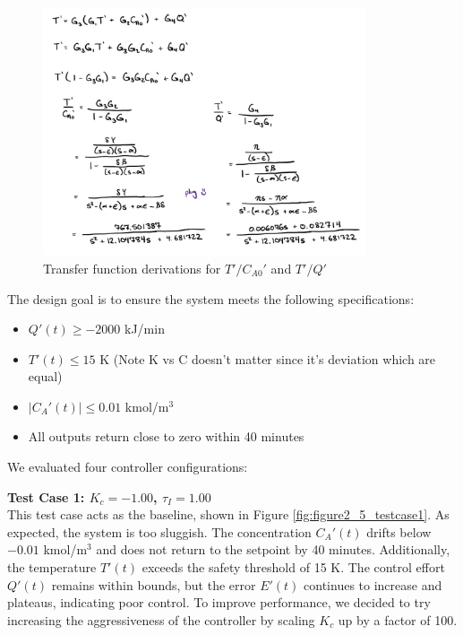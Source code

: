 \documentclass[12pt]{article}
\begin{document}
\begin{enumerate}
\begin{enumerate}
    \begin{figure}[H]
      \centering
      \includegraphics[width=0.85\textwidth]{Figures/figure2_5b.png}
      \caption{Transfer function derivations for $T'/C_{A0}'$ and $T'/Q'$}
      \label{fig:figure2_5b}
    \end{figure}
    
    The design goal is to ensure the system meets the following specifications:
    \begin{itemize}
      \item $Q'(t) \geq -2000$ kJ/min
      \item $T'(t) \leq 15$ K (Note K vs C doesn't matter since it's deviation which are equal)
      \item $|C_A'(t)| \leq 0.01$ kmol/m$^3$
      \item All outputs return close to zero within 40 minutes
    \end{itemize}
    
    We evaluated four controller configurations:
    
    \clearpage
    \textbf{Test Case 1: $K_c = -1.00$, $\tau_I = 1.00$} \\
    This test case acts as the baseline, shown in Figure \ref{fig:figure2_5_testcase1}. As expected, the system is too sluggish. The concentration $C_A'(t)$ drifts below $-0.01$ kmol/m$^3$ and does not return to the setpoint by 40 minutes. Additionally, the temperature $T'(t)$ exceeds the safety threshold of 15 K. The control effort $Q'(t)$ remains within bounds, but the error $E'(t)$ continues to increase and plateaus, indicating poor control. To improve performance, we decided to try increasing the aggressiveness of the controller by scaling $K_c$ up by a factor of 100.
    

\end{enumerate}
\end{enumerate}
\end{document}
